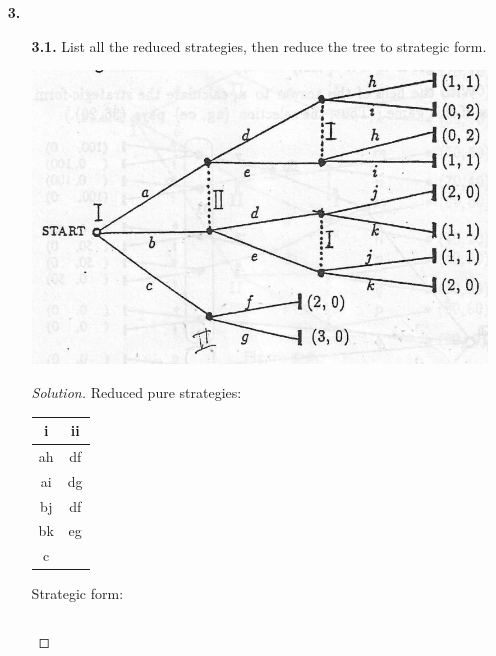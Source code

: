 \documentclass[ 12pt ]{article}
\begin{document}
\begin{enumerate}
\begin{enumerate}
				\begin{proof}[Solution]
					After inspecting the information sets we can see that there are 16, 128, and 128 full strategies for players \textbf{i}, \textbf{ii}, and \textbf{iii} respectively; additionally,
					there are 5, 26, and 16 reduced strategies for players \textbf{i}, \textbf{ii}, and \textbf{iii} respectively.
				\end{proof}
		\end{enumerate}


	\item[\textbf{3.}]
		\begin{enumerate}
			\item[\textbf{3.1.}] List all the reduced strategies, then reduce the tree to strategic form.
				\begin{center}
					\includegraphics{tree6}
				\end{center}
				\newpage
				\begin{proof}[Solution]
					Reduced pure strategies:
					\begin{center}
						\begin{tabular}{|c|c|}
							\hline
							\textbf{i} & \textbf{ii} \\
							\hline
							ah & df \\
							ai & dg \\
							bj & df \\
							bk & eg \\
							c & \\
							\hline
						\end{tabular}
					\end{center}
					Strategic form:
					\begin{center}
						\begin{tabular}{|c|c|c|c|c|}

\end{tabular}
\end{center}
\end{proof}
\end{enumerate}
\end{enumerate}
\end{document}
